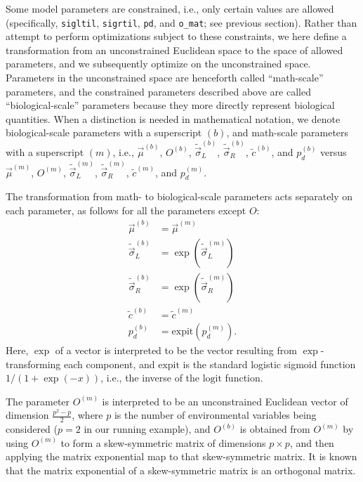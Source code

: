 \documentclass[11pt]{article}\usepackage[]{graphicx}\usepackage[]{xcolor}
\newcommand{\expit}{\text{expit}}
\newcommand{\logit}{\text{logit}}
\begin{document}
Some model parameters are constrained, i.e., only certain values are allowed (specifically, 
\texttt{sigltil}, \texttt{sigrtil}, \texttt{pd}, and \texttt{o\_mat}; see previous section). 
Rather than attempt to perform optimizations subject to these constraints, we 
here define a transformation from an unconstrained Euclidean space to 
the space of allowed parameters, and we subsequently optimize on the unconstrained space. 
Parameters in the unconstrained space are henceforth called
``math-scale'' parameters, and the constrained parameters described above are called 
``biological-scale'' parameters because they more directly represent biological quantities. 
When a distinction is needed in mathematical notation, we denote biological-scale parameters with a superscript
$(b)$, and math-scale parameters with a superscript $(m)$, i.e., $\vec{\mu}^{(b)}$, $O^{(b)}$, 
$\tilde{\vec{\sigma}}_L^{(b)}$,
$\tilde{\vec{\sigma}}_R^{(b)}$, $\tilde{c}^{(b)}$, and $p_d^{(b)}$ versus $\vec{\mu}^{(m)}$, $O^{(m)}$, 
$\tilde{\vec{\sigma}}_L^{(m)}$,
$\tilde{\vec{\sigma}}_R^{(m)}$, $\tilde{c}^{(m)}$, and $p_d^{(m)}$.

The transformation from math- to biological-scale parameters acts separately on each parameter, 
as follows for all the parameters except $O$:
\begin{align}
\vec{\mu}^{(b)} &= \vec{\mu}^{(m)} \label{eq:mutrans}\\
\tilde{\vec{\sigma}}_L^{(b)} &= \exp(\tilde{\vec{\sigma}}_L^{(m)}) \label{eq:sigLtrans}\\
\tilde{\vec{\sigma}}_R^{(b)} &= \exp(\tilde{\vec{\sigma}}_R^{(m)}) \label{eq:sigRtrans}\\
\tilde{c}^{(b)} &= \tilde{c}^{(m)} \label{eq:ctrans}\\
p_d^{(b)} &= \expit(p_d^{(m)}). \label{eq:pdtrans}
\end{align}
Here, $\exp$ of a vector is interpreted to be the vector resulting from
$\exp$-transforming each component, and $\expit$ is the standard logistic sigmoid
function $1/(1+\exp(-x))$, i.e., the inverse of the $\logit$ function.

The parameter $O^{(m)}$ is interpreted to be an unconstrained Euclidean vector
of dimension $\frac{p^2-p}{2}$, where $p$ is the number of environmental variables being considered
($p=2$ in our running example), and $O^{(b)}$ is obtained from $O^{(m)}$
by using $O^{(m)}$ to form a skew-symmetric matrix of dimensions $p \times p$, 
and then applying the matrix exponential map to that skew-symmetric matrix. It is known that
the matrix exponential of a skew-symmetric matrix is an orthogonal matrix.
\end{document}

